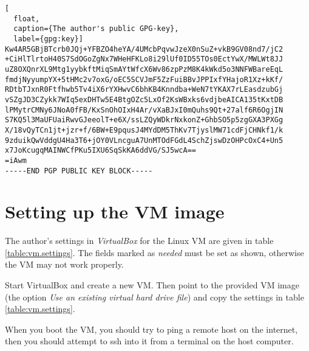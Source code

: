 \begin{lstlisting}[
  float,
  caption={The author's public GPG-key},
  label={gpg:key}]
Kw4AR5GBjBTcrb0JQj+YFBZO4heYA/4UMcbPqvwJzeX0nSuZ+vkB9GV08nd7/jC2
+CiHlTlrtoH40S7SdOGoZgNx7WHeHFKLo8i29lUf0ID55TOs0EctYwX/MWLWt8JJ
uZ8OXQnrXL9Mtg1yybkftMiqSmAYtWfcX6Wv86zpPzM8K4kWkd5o3NNFWBareEqL
fmdjNyyumpYX+5tHMc2v7oxG/oEC5SCVJmF5ZzFuiBBvJPPIxfYHajoR1Xz+kKf/
RDtbTJxnR0Ftfhwb5Tv4iX6rYXHwvC6bhKB4Knndba+WeN7tYKAX7rLEasdzubGj
vSZgJD3CZykk7WIq5exDHTw5E4BtgOZc5LxOf2KsWBxks6vdjbeAICA135tKxtDB
lPMytrCMNy6JNoA0fFB/KxSnOhOIxH4Ar/vXaBJxI0mQuhs9Qt+27alf6R6OgjIN
S7KQ5l3MaUFUaiRwvGJeeolT+e6X/ssLZQyWDkrNxkonZ+GhbSO5p5zgGXA3PXGg
X/18vQyTCn1jt+jzr+f/6BW+E9pqusJ4MYdDM5ThKv7TjyslMW71cdFjCHNkf1/k
9zduikQwVddgU4Ha3T6+jOY0VLncguA7UnMTOdFGdL4SchZjswDzOHPcOxC4+Un5
x7JoKcugqMAINWCfPKu5IXU6SqSkKA6ddVG/SJ5wcA==
=iAwm
-----END PGP PUBLIC KEY BLOCK-----
\end{lstlisting}
\clearpage %

\section{Setting up the VM image}

The author's settings in \textit{VirtualBox} for the Linux
VM are given in table \vref{table:vm.settings}.  The fields marked
as \textit{needed} must be set as shown, otherwise the VM may not work
properly.

Start VirtualBox and create a new VM.  Then point to the provided VM image
(the option \textit{Use an existing virtual hard drive file})
and copy the settings in table \vref{table:vm.settings}.

When you boot the VM, you should try to ping a remote host on the internet,
then you should attempt to ssh into it from a terminal on the host
computer.

